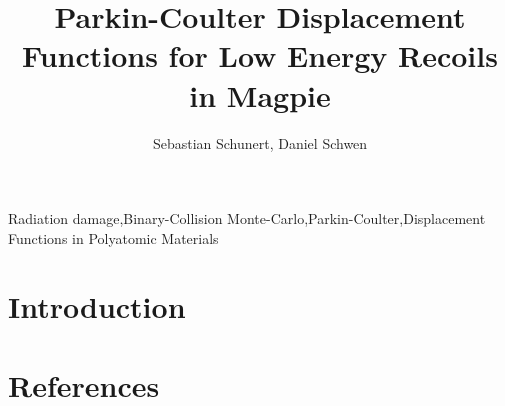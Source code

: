 \documentclass[review]{elsarticle}
\begin{document}
\begin{frontmatter}

\title{Parkin-Coulter Displacement Functions for Low Energy Recoils in Magpie}

\author{Sebastian Schunert, Daniel Schwen}
\address{Fuels Modeling and Simulation Department, Idaho National Laboratory, P.O Box 1625, Idaho Falls, ID 83415}




\begin{abstract}

\end{abstract}

\begin{keyword}
Radiation damage\sep Binary-Collision Monte-Carlo\sep Parkin-Coulter\sep Displacement Functions in Polyatomic Materials
\end{keyword}

\end{frontmatter}

\linenumbers

\section{Introduction}


\clearpage
\section*{References}

\end{document}
